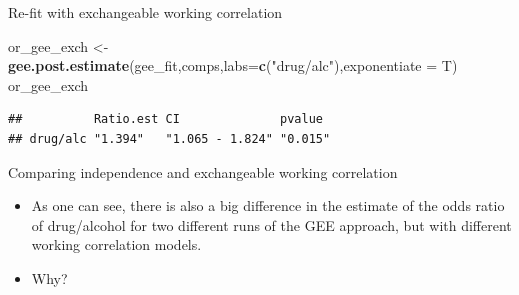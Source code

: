 \documentclass[ignorenonframetext,]{beamer}
\newenvironment{Shaded}{\begin{snugshade}}{\end{snugshade}}
\newcommand{\KeywordTok}[1]{\textcolor[rgb]{0.13,0.29,0.53}{\textbf{#1}}}
\newcommand{\DataTypeTok}[1]{\textcolor[rgb]{0.13,0.29,0.53}{#1}}
\newcommand{\StringTok}[1]{\textcolor[rgb]{0.31,0.60,0.02}{#1}}
\newcommand{\NormalTok}[1]{#1}
\begin{document}
\begin{frame}[fragile]{Re-fit with exchangeable working correlation}
\begin{Shaded}
\begin{Highlighting}[]
\NormalTok{or_gee_exch <-}\StringTok{ }\KeywordTok{gee.post.estimate}\NormalTok{(gee_fit,comps,}\DataTypeTok{labs=}\KeywordTok{c}\NormalTok{(}\StringTok{"drug/alc"}\NormalTok{),}\DataTypeTok{exponentiate =}\NormalTok{ T)            }
\NormalTok{or_gee_exch}
\end{Highlighting}
\end{Shaded}

\begin{verbatim}
##          Ratio.est CI              pvalue 
## drug/alc "1.394"   "1.065 - 1.824" "0.015"
\end{verbatim}

\end{frame}

\begin{frame}{Comparing independence and exchangeable working
correlation}

\begin{itemize}
\item
  As one can see, there is also a big difference in the estimate of the
  odds ratio of drug/alcohol for two different runs of the GEE approach,
  but with different working correlation models.
\item
  Why?
\end{itemize}

\end{frame}
\end{document}
